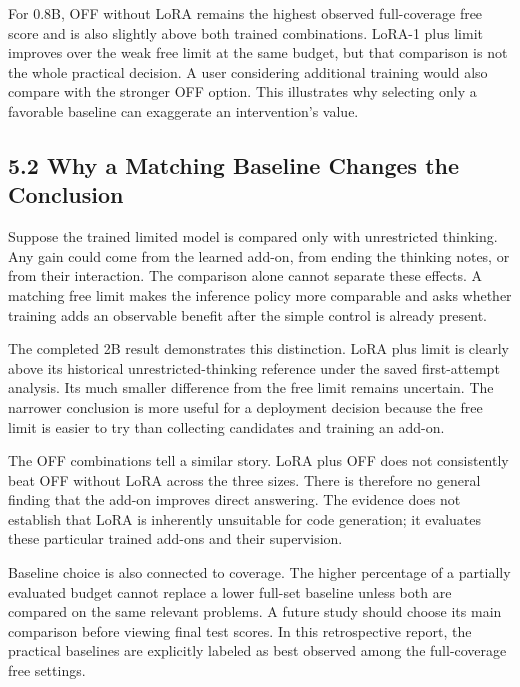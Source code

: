 \documentclass[11pt,letterpaper]{article}
\begin{document}
For 0.8B, OFF without LoRA remains the highest observed full-coverage free score and is also slightly above both trained combinations. LoRA-1 plus limit improves over the weak free limit at the same budget, but that comparison is not the whole practical decision. A user considering additional training would also compare with the stronger OFF option. This illustrates why selecting only a favorable baseline can exaggerate an intervention's value.\par

\subsection*{5.2 Why a Matching Baseline Changes the Conclusion}

Suppose the trained limited model is compared only with unrestricted thinking. Any gain could come from the learned add-on, from ending the thinking notes, or from their interaction. The comparison alone cannot separate these effects. A matching free limit makes the inference policy more comparable and asks whether training adds an observable benefit after the simple control is already present.\par

The completed 2B result demonstrates this distinction. LoRA plus limit is clearly above its historical unrestricted-thinking reference under the saved first-attempt analysis. Its much smaller difference from the free limit remains uncertain. The narrower conclusion is more useful for a deployment decision because the free limit is easier to try than collecting candidates and training an add-on.\par

The OFF combinations tell a similar story. LoRA plus OFF does not consistently beat OFF without LoRA across the three sizes. There is therefore no general finding that the add-on improves direct answering. The evidence does not establish that LoRA is inherently unsuitable for code generation; it evaluates these particular trained add-ons and their supervision.\par

Baseline choice is also connected to coverage. The higher percentage of a partially evaluated budget cannot replace a lower full-set baseline unless both are compared on the same relevant problems. A future study should choose its main comparison before viewing final test scores. In this retrospective report, the practical baselines are explicitly labeled as best observed among the full-coverage free settings.\par
\end{document}

